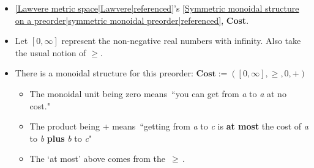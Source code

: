 
\begin{itemize}
    \item \ref{Lawvere metric space|Lawvere|referenced}'s \ref{Symmetric monoidal structure on a preorder|symmetric monoidal preorder|referenced}, \textbf{Cost}.
    \item Let $[0,\infty]$ represent the non-negative real numbers with infinity. Also take the usual notion of $\geq$.
    \item There is a monoidal structure for this preorder: $\mathbf{Cost}:=([0,\infty],\geq,0,+)$
          \begin{itemize}
            \item The monoidal unit being zero means \,``you can get from \emph{a} to \emph{a} at no cost."\,
            \item The product being + means \,``getting from \emph{a} to \emph{c} is \textbf{at most} the cost of \emph{a} to \emph{b} \textbf{plus} \emph{b} to \emph{c}"\,
            \item The `at most' above comes from the \,$\geq$\,.   \end{itemize}
  \end{itemize}

